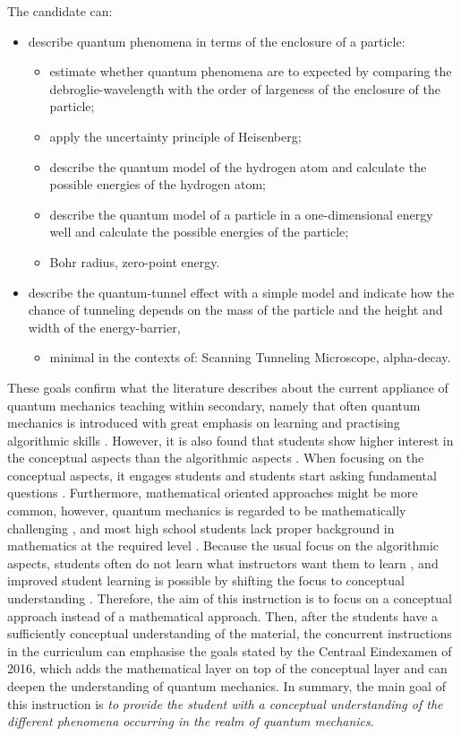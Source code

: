 \documentclass[11pt,twoside]{report} %
\begin{document}
The candidate can:
\begin{itemize}
\item describe quantum phenomena in terms of the enclosure of a particle:
\begin{itemize}
\item estimate whether quantum phenomena are to expected by comparing the debroglie-wavelength with the order of largeness of the enclosure of the particle;
\item apply the uncertainty principle of Heisenberg;
\item describe the quantum model of the hydrogen atom and calculate the possible energies of the hydrogen atom;
\item describe the quantum model of a particle in a one-dimensional energy well and calculate the possible energies of the particle;
\item Bohr radius, zero-point energy.
\end{itemize}
\item describe the quantum-tunnel effect with a simple model and indicate how the chance of tunneling depends on the mass of the particle and the height and width of the energy-barrier,
\begin{itemize}
\item minimal in the contexts of: Scanning Tunneling Microscope, alpha-decay.
\end{itemize} 
\end{itemize}

These goals confirm what the literature describes about the current appliance of quantum mechanics teaching within secondary, namely that often quantum mechanics is introduced with great emphasis on learning and practising algorithmic skills \cite{papaphotis1,papaphotis2}. However, it is also found that students show higher interest in the conceptual aspects than the algorithmic aspects \cite{papaphotis1,papaphotis2,levrini}. When focusing on the conceptual aspects, it engages students \cite{henriksen} and students start asking fundamental questions \cite{mckagan}. Furthermore, mathematical oriented approaches might be more common, however, quantum mechanics is regarded to be mathematically challenging \cite{gianino, mckagan}, and most high school students lack proper background in mathematics at the required level \cite{dori}. Because the usual focus on the algorithmic aspects, students often do not learn what instructors want them to learn \cite{asikainen, mckagan}, and improved student learning is possible by shifting the focus to conceptual understanding \cite{mckagan}. Therefore, the aim of this instruction is to focus on a conceptual approach instead of a mathematical approach. Then, after the students have a sufficiently conceptual understanding of the material, the concurrent instructions in the curriculum can emphasise the goals stated by the Centraal Eindexamen of 2016, which adds the mathematical layer on top of the conceptual layer and can deepen the understanding of quantum mechanics. In summary, the main goal of this instruction is \emph{to provide the student with a conceptual understanding of the different phenomena occurring in the realm of quantum mechanics}.
\end{document}
